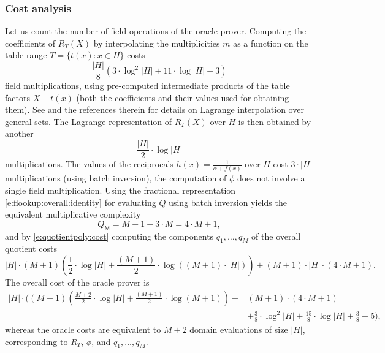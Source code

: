 \documentclass[11pt]{article}
\theoremstyle{definition}
\theoremstyle{remark}
\begin{document}
\subsubsection*{Cost analysis}

Let us count the number of field operations of the oracle prover.
Computing the coefficients of $R_T(X)$ by interpolating the multiplicities $m$ as a function on the table range $T=\{t(x) : x\in H\}$ costs 
\[
\frac{|H|}{8} \left(3\cdot \log^2|H| + 11\cdot\log|H| + 3 \right)
\] 
field multiplications, using pre-computed intermediate products of the table factors $X + t(x)$ (both the coefficients and their values used for obtaining them). 
See \cite{flookup} and the references therein for details on Lagrange interpolation over general sets.
The Lagrange representation of $R_T(X)$ over $H$ is then obtained by another 
\[
\frac{|H|}{2} \cdot \log |H|
\]
multiplications.
The values of the reciprocals $h(x) = \frac{1}{\alpha + f(x)}$ over $H$ cost $3\cdot |H|$ multiplications (using batch inversion), the computation of $\phi$ does not involve a single field multiplication.
Using the fractional representation \eqref{e:flookup:overall:identity} for evaluating $Q$ using batch inversion yields the equivalent multiplicative complexity
\[
Q_\mathsf M = M + 1 +3\cdot M = 4\cdot M + 1,
\]
and by \eqref{e:quotientpoly:cost} computing the components $q_1, \ldots, q_M$ of the overall quotient costs 
\[
|H|\cdot (M+1) \left(\frac{1}{2} \cdot\log|H| + \frac{(M+1)}{2} \cdot\log((M+1)\cdot|H|) \right)+ (M+1)\cdot |H|\cdot (4\cdot M + 1). 
\]
The overall cost of the oracle prover is 
\begin{equation}
\label{e:uv:flookup:cost}
\begin{aligned}
|H|\cdot \Bigg((M+1) \left(\frac{M+2}{2} \cdot\log|H| + \frac{(M+1)}{2} \cdot\log(M+1) \right) + &(M+1) \cdot (4\cdot M + 1)
\\
&+ \frac{3}{8}\cdot \log^2|H| + \frac{15}{8}\cdot\log|H| + \frac{3}{8} + 5
\Bigg),
\end{aligned}
\end{equation}
whereas the oracle costs are equivalent to $M+2$ domain evaluations of size $|H|$, corresponding to $R_T$, $\phi$, and $q_1, \ldots, q_M$.
\end{document}
